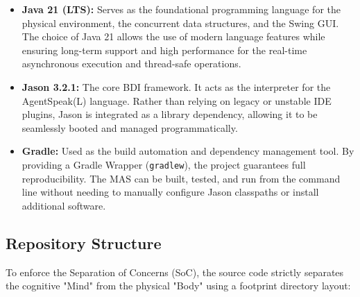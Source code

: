 \documentclass{scrartcl}
\begin{document}
\begin{itemize}
\item \textbf{Java 21 (LTS):} Serves as the foundational programming language for the physical environment, the concurrent data structures, and the Swing GUI. The choice of Java 21 allows the use of modern language features while ensuring long-term support and high performance for the real-time asynchronous execution and thread-safe operations.
\item \textbf{Jason 3.2.1:} The core BDI framework. It acts as the interpreter for the AgentSpeak(L) language. Rather than relying on legacy or unstable IDE plugins, Jason is integrated as a library dependency, allowing it to be seamlessly booted and managed programmatically.
\item \textbf{Gradle:} Used as the build automation and dependency management tool. By providing a Gradle Wrapper (\texttt{gradlew}), the project guarantees full reproducibility. The MAS can be built, tested, and run from the command line without needing to manually configure Jason classpaths or install additional software.
\end{itemize}


\subsection{Repository Structure}

To enforce the Separation of Concerns (SoC), the source code strictly separates the cognitive "Mind" from the physical "Body" using a footprint directory layout:
\end{document}
